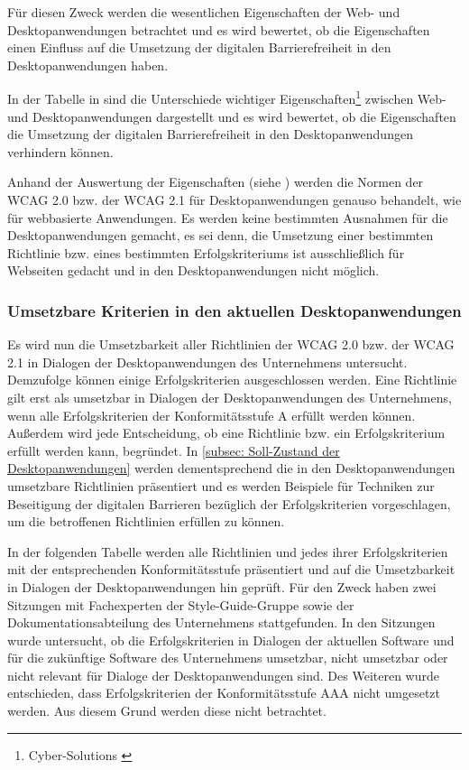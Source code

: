 Für diesen Zweck werden die wesentlichen Eigenschaften der Web- und Desktopanwendungen betrachtet und es wird bewertet, ob die Eigenschaften einen Einfluss auf die Umsetzung der digitalen Barrierefreiheit in den Desktopanwendungen haben.

In der Tabelle in  sind die Unterschiede wichtiger Eigenschaften\footnote{Cyber-Solutions \cite{CyberSolutions}} zwischen Web- und Desktopanwendungen dargestellt und es wird bewertet, ob die Eigenschaften die Umsetzung der digitalen Barrierefreiheit in den Desktopanwendungen verhindern können.

Anhand der Auswertung der Eigenschaften (siehe ) werden die Normen der \ac{WCAG} 2.0 bzw. der \ac{WCAG} 2.1 für Desktopanwendungen genauso behandelt, wie für webbasierte Anwendungen. Es werden keine bestimmten Ausnahmen für die Desktopanwendungen gemacht, es sei denn, die Umsetzung einer bestimmten Richtlinie bzw. eines bestimmten Erfolgskriteriums ist ausschließlich für Webseiten gedacht und in den Desktopanwendungen nicht möglich.

\subsubsection{Umsetzbare Kriterien in den aktuellen Desktopanwendungen}
\label{subsec: Umsetzbare Kriterien}

Es wird nun die Umsetzbarkeit aller Richtlinien der \ac{WCAG} 2.0 bzw. der \ac{WCAG} 2.1 in Dialogen der Desktopanwendungen des Unternehmens untersucht. Demzufolge können einige  Erfolgskriterien ausgeschlossen werden. Eine Richtlinie gilt erst als umsetzbar in Dialogen der Desktopanwendungen des Unternehmens, wenn alle Erfolgskriterien der Konformitätsstufe A erfüllt werden können. Außerdem wird jede Entscheidung, ob eine Richtlinie bzw. ein Erfolgskriterium erfüllt werden kann, begründet. In \cref{subsec: Soll-Zustand der Desktopanwendungen} werden dementsprechend die in den Desktopanwendungen umsetzbare Richtlinien präsentiert und es werden Beispiele für Techniken zur Beseitigung der digitalen Barrieren bezüglich der Erfolgskriterien vorgeschlagen, um die betroffenen Richtlinien erfüllen zu können.

In der folgenden Tabelle werden alle Richtlinien und jedes ihrer Erfolgskriterien mit der entsprechenden Konformitätsstufe präsentiert und auf die Umsetzbarkeit in Dialogen der Desktopanwendungen hin geprüft. Für den Zweck haben zwei Sitzungen mit Fachexperten der Style-Guide-Gruppe sowie der Dokumentationsabteilung des Unternehmens stattgefunden. In den Sitzungen wurde untersucht, ob die Erfolgskriterien in Dialogen der aktuellen Software und für die zukünftige Software des Unternehmens umsetzbar, nicht umsetzbar oder nicht relevant für Dialoge der Desktopanwendungen sind. Des Weiteren wurde entschieden, dass Erfolgskriterien der Konformitätsstufe AAA nicht umgesetzt werden. Aus diesem Grund werden diese nicht betrachtet.

